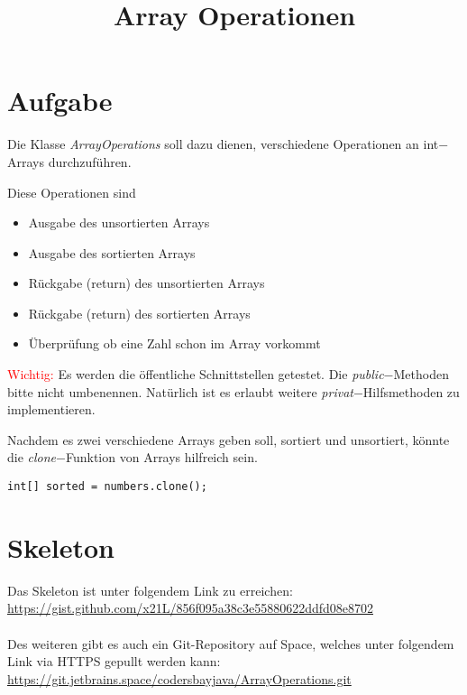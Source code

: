 \documentclass[12pt, oneside]{article}   	%
\title{
Array Operationen \\
\vspace{0.3cm}
}
\date{}							%
\begin{document}
 \setlength{\parindent}{0em} 
\maketitle

\section{Aufgabe}

Die Klasse \textit{ArrayOperations} soll dazu dienen, verschiedene Operationen an int$-$Arrays durchzuführen. \\

\vspace{0.5cm}

Diese Operationen sind
\begin{itemize}
	\item Ausgabe des unsortierten Arrays
	\item Ausgabe des sortierten Arrays
	\item Rückgabe (return) des unsortierten Arrays
	\item Rückgabe (return) des sortierten Arrays
	\item Überprüfung ob eine Zahl schon im Array vorkommt
\end{itemize}
\vspace{0.5cm}
\textcolor{red}{Wichtig: } Es werden die öffentliche Schnittstellen getestet. Die \textit{public}$-$Methoden bitte nicht umbenennen. Natürlich ist es erlaubt weitere \textit{privat}$-$Hilfsmethoden zu implementieren.

\vspace{0.5cm}
Nachdem es zwei verschiedene Arrays geben soll, sortiert und unsortiert, könnte die \textit{clone}$-$Funktion von Arrays hilfreich sein.\\

\begin{verbatim}
int[] sorted = numbers.clone();
\end{verbatim}
\vspace{0.5cm}
\section*{Skeleton}
Das Skeleton ist unter folgendem Link zu erreichen: \\ \url{https://gist.github.com/x21L/856f095a38c3e55880622ddfd08e8702} \\ \\
Des weiteren gibt es auch ein Git-Repository auf Space, welches unter folgendem Link via HTTPS gepullt werden kann: \\ \url{https://git.jetbrains.space/codersbayjava/ArrayOperations.git}
\newpage
\end{document}
